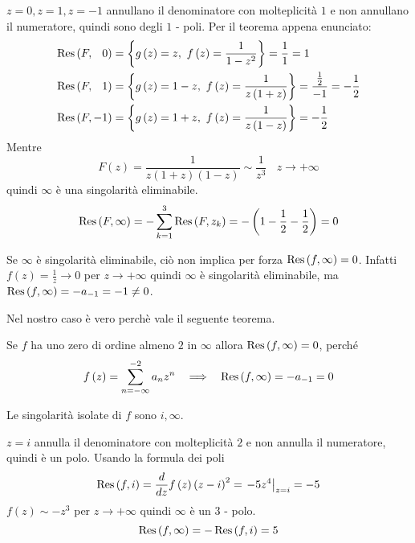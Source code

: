 $z = 0,z = 1,z = -1$ annullano il denominatore con molteplicità $1$ e non annullano il numeratore, quindi sono degli $1$ - poli. Per il teorema appena enunciato:
\begin{align*}
\Res \left(F,\phantom{ - }0\right) & = \left\{g\left(z\right) =  z,\ f\left(z\right) = \frac{1}{1 - z^{2}}\right\} = \frac{1}{1} = 1\\
\Res \left(F,\phantom{ - }1\right) & = \left\{g\left(z\right) = 1 - z,\ f\left(z\right) = \frac{1}{z\left(1 + z\right)}\right\} = \frac{\frac{1}{2}}{ - 1} = - \frac{1}{2}\\
\Res \left(F, - 1\right) 			 & = \left\{g\left(z\right) = 1 + z,\ f\left(z\right) = \frac{1}{z\left(1 - z\right)}\right\} = - \frac{1}{2}
\end{align*}
Mentre
\begin{equation*}
F\left(z\right) = \frac{1}{z\left(1 + z\right)\left(1 - z\right)} \sim \frac{1}{z^{3}} \ \ \ \ z\rightarrow + \infty 
\end{equation*}
quindi $\infty $ è una singolarità eliminabile.
\begin{equation*}
\operatorname{Res} \left(F,\infty \right) = - \sum\limits ^{3}_{k = 1}\operatorname{Res} \left(F,z_{k}\right) = - \left(1 - \frac{1}{2} - \frac{1}{2}\right) = 0
\end{equation*}
\begin{rem}
Se $\infty $ è singolarità eliminabile, ciò non implica per forza $\operatorname{Res} \left(f,\infty \right) = 0$. Infatti $f\left(z\right) = \frac{1}{z}\rightarrow 0$ per $z\rightarrow + \infty $ quindi $\infty $ è singolarità eliminabile, ma $\operatorname{Res} \left(f,\infty \right) = - a_{ - 1} = - 1\neq 0$.
\end{rem}
\begin{rem}
Nel nostro caso è vero perchè vale il seguente teorema.
\end{rem}
\begin{thm}
Se $f$ ha uno zero di ordine almeno $2$ in $\infty $ allora $\operatorname{Res} \left(f,\infty \right) = 0$, perché
\begin{equation*}
f\left(z\right) = \sum\limits ^{ - 2}_{n = -\infty } a_{n} z^{n} \ \ \implies \ \ \operatorname{Res} \left(f,\infty \right) = - a_{ - 1} = 0
\end{equation*}
\end{thm}
\Soluzione

Le singolarità isolate di $f$ sono $i,\infty $.

$z = i$ annulla il denominatore con molteplicità $2$ e non annulla il numeratore, quindi è un polo. Usando la formula dei poli
\begin{equation*}
\operatorname{Res} \left(f,i\right) = \frac{d}{dz} f\left(z\right)\left(z - i\right)^{2} = \left. - 5z^{4}\right| _{z = i} = - 5
\end{equation*}
$f\left(z\right) \sim - z^{3}$ per $z\rightarrow + \infty $ quindi $\infty $ è un $3$ - polo.
\begin{equation*}
\operatorname{Res} \left(f,\infty \right) = - \operatorname{Res} \left(f,i\right) = 5
\end{equation*}
\Soluzione

